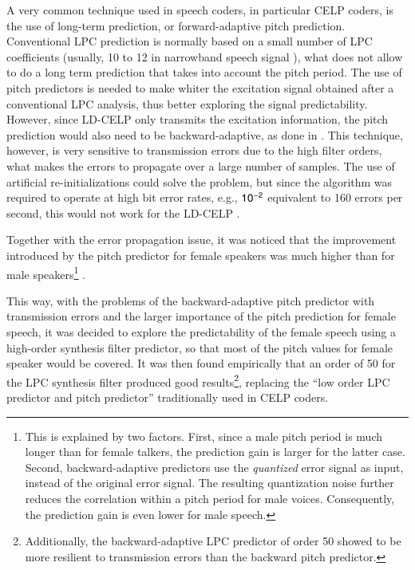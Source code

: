 A very common technique used in speech coders, in particular CELP
coders, is the use of long-term prediction, or forward-adaptive pitch
prediction. Conventional LPC prediction is normally based on a small
number of LPC coefficients (usually, 10 to 12 in narrowband speech signal
\cite[pp.419--420]{Rabiner-Schafer}), what does not allow to do a long
term prediction that takes into account the pitch period. The use of
pitch predictors is needed to make whiter the excitation signal
obtained after a conventional LPC analysis, thus better exploring the
signal predictability. However, since LD-CELP only transmits the
excitation information, the pitch prediction would also need to be
backward-adaptive, as done in \cite{BNR-coder,LD-VCX}. This technique,
however, is very sensitive to transmission errors due to the high
filter orders, what makes the errors to propagate over a large number
of samples. The use of artificial re-initializations could solve the
problem, but since the algorithm was required to operate at high bit
error rates, e.g., $\sf 10^{-2}$ equivalent to 160 errors per
second, this would not work for the LD-CELP \cite{LD-CELP-Phase2}.

Together with the error propagation issue, it was noticed that the
improvement introduced by the pitch predictor for female speakers was
much higher than for male speakers\footnote{\sf This is explained by
two factors. First, since a male pitch period is much longer than
for female talkers, the prediction gain is larger for the latter
case. Second, backward-adaptive predictors use the {\em quantized}
error signal as input, instead of the original error signal. The
resulting quantization noise further reduces the correlation within a
pitch period for male voices. Consequently, the prediction gain is
even lower for male speech.}%
\cite{LD-CELP-Phase2}.

This way, with the problems of the backward-adaptive pitch predictor
with transmission errors and the larger importance of the pitch
prediction for female speech, it was decided to explore the
predictability of the female speech using a high-order synthesis
filter predictor, so that most of the pitch values for female speaker
would be covered. It was then found empirically that an order of 50
for the LPC synthesis filter produced good results\footnote{\sf
  Additionally, the backward-adaptive LPC predictor of order 50 showed
  to be more resilient to transmission errors than the backward pitch
  predictor.}, replacing the ``low order LPC predictor and pitch
predictor'' traditionally used in CELP coders.


